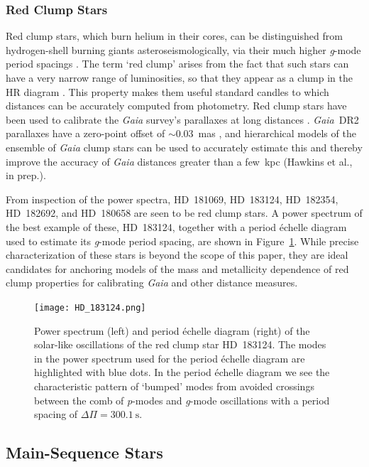 \documentclass[a4paper,fleqn,usenatbib]{mnras}
\newcommand{\gaia}{\textit{Gaia}\xspace}
\begin{document}
\subsubsection{Red Clump Stars}
\label{clumpstars}

Red clump stars, which burn helium in their cores, can be distinguished from hydrogen-shell burning giants asteroseismologically, via their much higher \textit{g}-mode period spacings \citep{rggmodehelium}. 
The term `red clump' arises from the fact that such stars can have a very narrow range of luminosities, so that they appear as a clump in the HR diagram \citep{2016ARA&A..54...95G}. This property makes them useful standard candles to which distances can be accurately computed from photometry. Red clump stars have been used to calibrate the \gaia survey's parallaxes at long distances \citep{2017A&A...598L...4D,2017MNRAS.471..722H,2018A&A...609A.116R}. \gaia~DR2 parallaxes have a zero-point offset of $\sim 0.03$~mas \citep{gaiadr2parallax}, and hierarchical models of the ensemble of \gaia clump stars can be used to accurately estimate this and thereby improve the accuracy of \gaia distances greater than a few~kpc (Hawkins et al., in prep.).

From inspection of the power spectra, HD~181069, HD~183124, HD~182354, HD~182692, and HD~180658 are seen to be red clump stars. A power spectrum of the best example of these, HD~183124, together with a period \'{e}chelle diagram used to estimate its \textit{g}-mode period spacing, are shown in Figure~\ref{HD_183124}. While precise characterization of these stars is beyond the scope of this paper, they are ideal candidates for anchoring models of the mass and metallicity dependence of red clump properties for calibrating \gaia and other distance measures. 

\begin{figure}
\noindent\texttt{[image: HD\_183124.png]}

\caption{\label{HD_183124}
Power spectrum (left) and period \'{e}chelle diagram (right) of the solar-like oscillations of the red clump star HD~183124. The modes in the power spectrum used for the period \'{e}chelle diagram are highlighted with blue dots. In the period \'{e}chelle diagram we see the characteristic pattern of `bumped' modes from avoided crossings between the comb of \textit{p}-modes and \textit{g}-mode oscillations with a period spacing of $\Delta \Pi = 300.1~\text{s}$.}
\end{figure}


\subsection{Main-Sequence Stars}
\label{mainseq}
\end{document}
